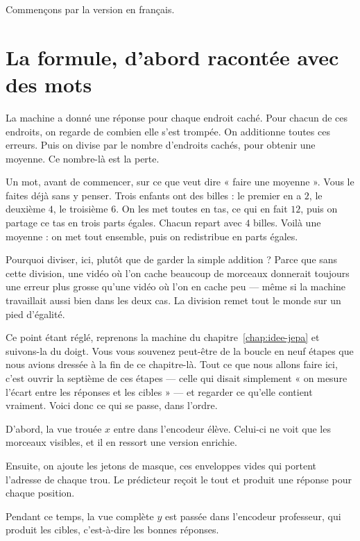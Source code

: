 Commençons par la version en français.

\section{La formule, d'abord racontée avec des mots}

\begin{enclair}
La machine a donné une réponse pour chaque endroit caché. Pour chacun de ces
endroits, on regarde de combien elle s'est trompée. On additionne toutes ces
erreurs. Puis on divise par le nombre d'endroits cachés, pour obtenir une
moyenne. Ce nombre-là est la perte.
\end{enclair}

Un mot, avant de commencer, sur ce que veut dire « faire une moyenne ». Vous
le faites déjà sans y penser. Trois enfants ont des billes : le premier en a
$2$, le deuxième $4$, le troisième $6$. On les met toutes en tas, ce qui en
fait $12$, puis on partage ce tas en trois parts égales. Chacun repart avec
$4$ billes. Voilà une moyenne : on met tout ensemble, puis on redistribue en
parts égales.

Pourquoi diviser, ici, plutôt que de garder la simple addition ? Parce que
sans cette division, une vidéo où l'on cache beaucoup de morceaux donnerait
toujours une erreur plus grosse qu'une vidéo où l'on en cache peu — même si
la machine travaillait aussi bien dans les deux cas. La division remet tout
le monde sur un pied d'égalité.

Ce point étant réglé, reprenons la machine du chapitre~\ref{chap:idee-jepa}
et suivons-la du doigt. Vous vous souvenez peut-être de la boucle en neuf
étapes que nous avions dressée à la fin de ce chapitre-là. Tout ce que nous
allons faire ici, c'est ouvrir la septième de ces étapes — celle qui disait
simplement « on mesure l'écart entre les réponses et les cibles » — et
regarder ce qu'elle contient vraiment. Voici donc ce qui se passe, dans
l'ordre.

D'abord, la vue trouée $x$ entre dans l'encodeur élève. Celui-ci ne voit que
les morceaux visibles, et il en ressort une version enrichie.

Ensuite, on ajoute les jetons de masque, ces enveloppes vides qui portent
l'adresse de chaque trou. Le prédicteur reçoit le tout et produit une
réponse pour chaque position.

Pendant ce temps, la vue complète $y$ est passée dans l'encodeur professeur,
qui produit les cibles, c'est-à-dire les bonnes réponses.

